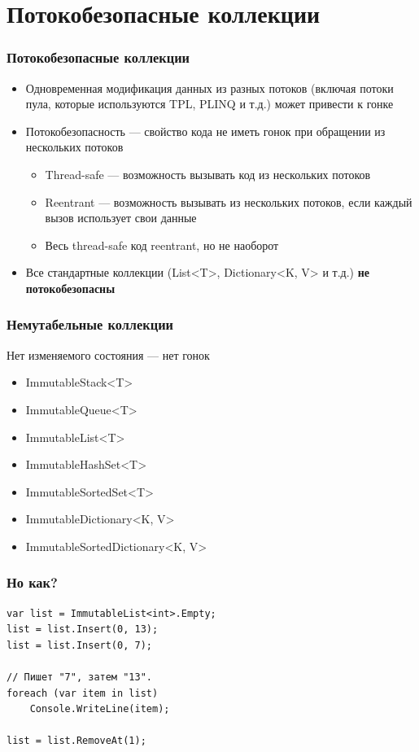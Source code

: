 \documentclass[xetex,mathserif,serif]{beamer}
\begin{document}
	\section{Потокобезопасные коллекции}

	\begin{frame}
		\frametitle{Потокобезопасные коллекции}
		\begin{itemize}
			\item Одновременная модификация данных из разных потоков (включая потоки пула, которые используются TPL, PLINQ и т.д.) может привести к гонке
			\item Потокобезопасность --- свойство кода не иметь гонок при обращении из нескольких потоков
			\begin{itemize}
				\item Thread-safe --- возможность вызывать код из нескольких потоков
				\item Reentrant --- возможность вызывать из нескольких потоков, если каждый вызов использует свои данные
				\item Весь thread-safe код reentrant, но не наоборот
			\end{itemize}
			\item Все стандартные коллекции (List<T>, Dictionary<K, V> и т.д.) \textbf{не потокобезопасны}
		\end{itemize}
	\end{frame}

	\begin{frame}
		\frametitle{Немутабельные коллекции}
		Нет изменяемого состояния --- нет гонок
		\begin{itemize}
			\item ImmutableStack<T>
			\item ImmutableQueue<T>
			\item ImmutableList<T>
			\item ImmutableHashSet<T>
			\item ImmutableSortedSet<T>
			\item ImmutableDictionary<K, V>
			\item ImmutableSortedDictionary<K, V>
		\end{itemize}
	\end{frame}

	\begin{frame}[fragile]
		\frametitle{Но как?}
		\begin{verbatim}
var list = ImmutableList<int>.Empty;
list = list.Insert(0, 13);
list = list.Insert(0, 7);

// Пишет "7", затем "13".
foreach (var item in list)
    Console.WriteLine(item);

list = list.RemoveAt(1);
		\end{verbatim}
	\end{frame}
\end{document}
